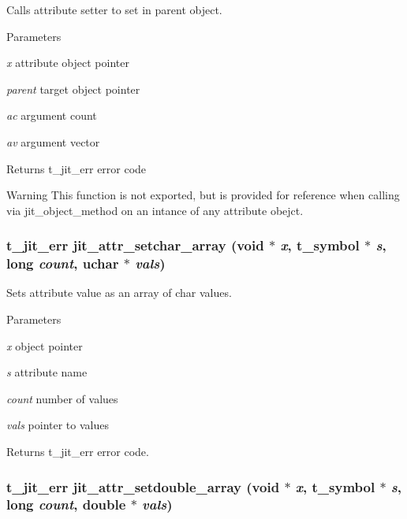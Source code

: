 Calls attribute setter to set in parent object. 
\begin{DoxyParams}{Parameters}
\item[{\em x}]attribute object pointer \item[{\em parent}]target object pointer \item[{\em ac}]argument count \item[{\em av}]argument vector\end{DoxyParams}
\begin{DoxyReturn}{Returns}
t\_\-jit\_\-err error code
\end{DoxyReturn}
\begin{DoxyWarning}{Warning}
This function is not exported, but is provided for reference when calling via jit\_\-object\_\-method on an intance of any attribute obejct. 
\end{DoxyWarning}
\hypertarget{group__attrmod_ga3ce21cdc4980561a8b0d975230702f9a}{
\subsubsection[{jit\_\-attr\_\-setchar\_\-array}]{\setlength{\rightskip}{0pt plus 5cm}t\_\-jit\_\-err jit\_\-attr\_\-setchar\_\-array (void $\ast$ {\em x}, \/  {\bf t\_\-symbol} $\ast$ {\em s}, \/  long {\em count}, \/  {\bf uchar} $\ast$ {\em vals})}}
\label{group__attrmod_ga3ce21cdc4980561a8b0d975230702f9a}


Sets attribute value as an array of char values. 
\begin{DoxyParams}{Parameters}
\item[{\em x}]object pointer \item[{\em s}]attribute name \item[{\em count}]number of values \item[{\em vals}]pointer to values\end{DoxyParams}
\begin{DoxyReturn}{Returns}
t\_\-jit\_\-err error code. 
\end{DoxyReturn}
\hypertarget{group__attrmod_gad19a96b12e411560bafc66fae187c9f3}{
\subsubsection[{jit\_\-attr\_\-setdouble\_\-array}]{\setlength{\rightskip}{0pt plus 5cm}t\_\-jit\_\-err jit\_\-attr\_\-setdouble\_\-array (void $\ast$ {\em x}, \/  {\bf t\_\-symbol} $\ast$ {\em s}, \/  long {\em count}, \/  double $\ast$ {\em vals})}}
\label{group__attrmod_gad19a96b12e411560bafc66fae187c9f3}



